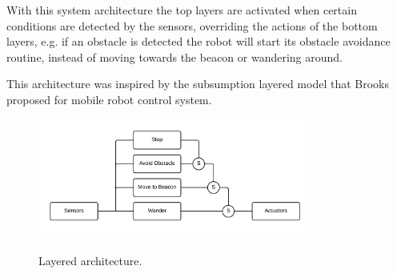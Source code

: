 \documentclass[oribibl]{llncs}
\begin{document}
With this system architecture the top layers are activated when certain conditions are detected by the sensors, overriding the actions of the bottom layers, e.g. if an obstacle is detected the robot will start its obstacle avoidance routine, instead of moving towards the beacon or wandering around. 

This architecture was inspired by the subsumption layered model that Brooks proposed for mobile robot control system.\cite{Brooks_1986}

\begin{figure}
  \centering
  \includegraphics[width=0.8\textwidth]{layer-architecture.png}
  \label{fig:layered}
  \caption{Layered architecture.}
\end{figure}
\end{document}
